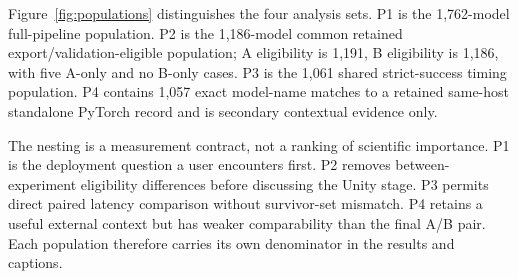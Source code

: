 Figure~\ref{fig:populations} distinguishes the four analysis sets. P1 is the 1,762-model full-pipeline population. P2 is the 1,186-model common retained export/validation-eligible population; A eligibility is 1,191, B eligibility is 1,186, with five A-only and no B-only cases. P3 is the 1,061 shared strict-success timing population. P4 contains 1,057 exact model-name matches to a retained same-host standalone PyTorch record and is secondary contextual evidence only.

The nesting is a measurement contract, not a ranking of scientific importance. P1 is the deployment question a user encounters first. P2 removes between-experiment eligibility differences before discussing the Unity stage. P3 permits direct paired latency comparison without survivor-set mismatch. P4 retains a useful external context but has weaker comparability than the final A/B pair. Each population therefore carries its own denominator in the results and captions.

\PopulationFigure
